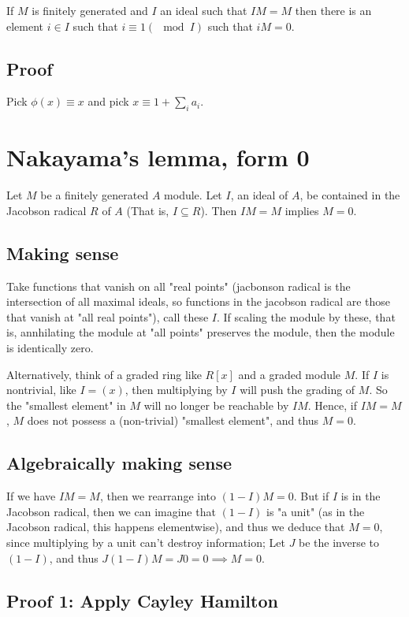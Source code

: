 \documentclass{book}
\begin{document}
If $M$ is finitely generated and $I$ an ideal such that $IM = M$ then there is an element $i \in I$
such that $i \equiv 1 (\mod I)$ such that $iM = 0$.

\subsection{Proof}

Pick $\phi(x) \equiv x$ and pick $x \equiv 1 + \sum_i a_i$.

\section{Nakayama's lemma, form 0}
Let $M$ be a finitely generated $A$ module. Let $I$, an ideal of $A$, be contained in the Jacobson
radical $R$ of $A$ (That is, $I \subseteq R$).  Then $IM = M$ implies $M = 0$.

\subsection{Making sense}

Take functions that vanish on all "real points" (jacbonson radical is the intersection of all maximal 
ideals, so functions in the jacobson radical are those that vanish at "all real points"),
call these $I$. If scaling the module by these, that is, annhilating the module at "all points"
preserves the module, then the module is identically zero.

Alternatively, think of a graded ring like $R[x]$ and a graded module $M$.
If $I$ is nontrivial, like $I = (x)$, then multiplying
by $I$ will push the grading of $M$. So the "smallest element" in $M$ will no longer be reachable by $IM$.
Hence, if $IM = M$, $M$ does not possess a (non-trivial) "smallest element", and thus $M = 0$.

\subsection{Algebraically making sense}

If we have $IM = M$, then we rearrange into $(1 - I)M = 0$. But if $I$ is in the Jacobson radical,
then we can imagine that $(1 - I)$ is "a unit" (as in the Jacobson radical, this happens elementwise),
and thus we deduce that $M = 0$, since multiplying by a unit can't destroy information; Let $J$ be the
inverse to $(1 - I)$, and thus $J(1 - I)M = J0 = 0 \implies M = 0$.

\subsection{Proof 1: Apply Cayley Hamilton}
\end{document}
